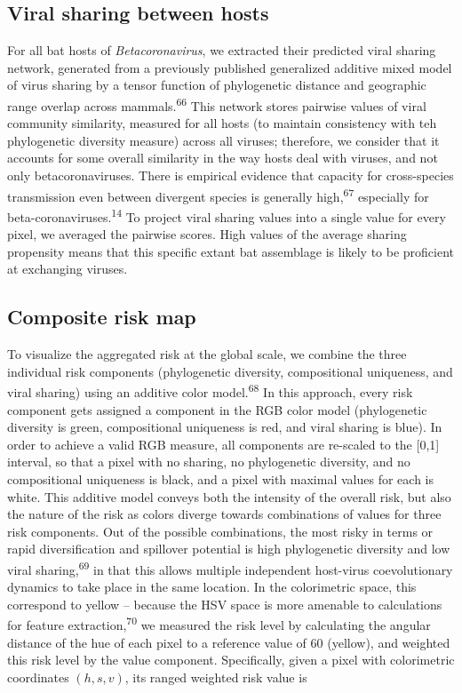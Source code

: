 \documentclass[10pt,oneside]{article}
\begin{document}
\hypertarget{viral-sharing-between-hosts}{%
\subsection{Viral sharing between
hosts}\label{viral-sharing-between-hosts}}

For all bat hosts of \emph{Betacoronavirus}, we extracted their
predicted viral sharing network, generated from a previously published
generalized additive mixed model of virus sharing by a tensor function
of phylogenetic distance and geographic range overlap across
mammals.\textsuperscript{66} This network stores pairwise values of
viral community similarity, measured for all hosts (to maintain
consistency with teh phylogenetic diversity measure) across all viruses;
therefore, we consider that it accounts for some overall similarity in
the way hosts deal with viruses, and not only betacoronaviruses. There
is empirical evidence that capacity for cross-species transmission even
between divergent species is generally high,\textsuperscript{67}
especially for beta-coronaviruses.\textsuperscript{14} To project viral
sharing values into a single value for every pixel, we averaged the
pairwise scores. High values of the average sharing propensity means
that this specific extant bat assemblage is likely to be proficient at
exchanging viruses.

\hypertarget{composite-risk-map}{%
\subsection{Composite risk map}\label{composite-risk-map}}

To visualize the aggregated risk at the global scale, we combine the
three individual risk components (phylogenetic diversity, compositional
uniqueness, and viral sharing) using an additive color
model.\textsuperscript{68} In this approach, every risk component gets
assigned a component in the RGB color model (phylogenetic diversity is
green, compositional uniqueness is red, and viral sharing is blue). In
order to achieve a valid RGB measure, all components are re-scaled to
the {[}0,1{]} interval, so that a pixel with no sharing, no phylogenetic
diversity, and no compositional uniqueness is black, and a pixel with
maximal values for each is white. This additive model conveys both the
intensity of the overall risk, but also the nature of the risk as colors
diverge towards combinations of values for three risk components. Out of
the possible combinations, the most risky in terms or rapid
diversification and spillover potential is high phylogenetic diversity
and low viral sharing,\textsuperscript{69} in that this allows multiple
independent host-virus coevolutionary dynamics to take place in the same
location. In the colorimetric space, this correspond to yellow --
because the HSV space is more amenable to calculations for feature
extraction,\textsuperscript{70} we measured the risk level by
calculating the angular distance of the hue of each pixel to a reference
value of 60 (yellow), and weighted this risk level by the value
component. Specifically, given a pixel with colorimetric coordinates
\((h,s,v)\), its ranged weighted risk value is
\end{document}

